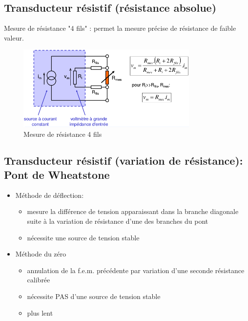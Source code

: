 \subsection{Transducteur résistif (résistance absolue)}
Mesure de résistance "4 fils" : permet la mesure précise de résistance de faible valeur.
\begin{figure}[H] 
	\centering 
	\includegraphics[width=0.8\textwidth,height=10\baselineskip,keepaspectratio]{ch4/image6} 
	\caption{Mesure de résistance 4 fils} 
\end{figure}
\subsection{Transducteur résistif (variation de résistance): Pont de Wheatstone}
	\begin{itemize}
		\item Méthode de déflection:
		\begin{itemize}
			\item mesure la différence de tension apparaissant dans la branche diagonale suite à la variation de résistance d'une des branches du pont
			\item nécessite une source de tension stable
		\end{itemize}
		\item Méthode du zéro
		\begin{itemize}
			\item annulation de la f.e.m. précédente par variation d'une seconde résistance calibrée
			\item nécessite PAS d'une source de tension stable
			\item plus lent
		\end{itemize}
	\end{itemize}
